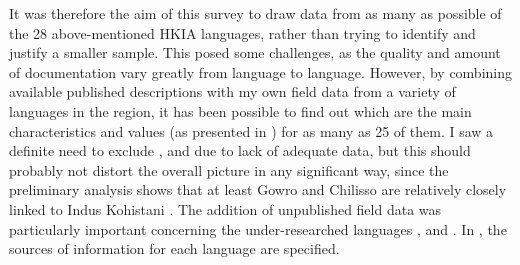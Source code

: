 \documentclass[output=collectionpaper]{langsci/langscibook}
\begin{document}
It was therefore the aim of this survey to draw data from as many as possible of the 28 above-mentioned HKIA languages, rather than trying to identify and justify a smaller sample. This posed some challenges, as the quality and amount of documentation vary greatly from language to language. However, by combining available published descriptions with my own field data from a variety of languages in the region, it has been possible to find out which are the main characteristics and values (as presented in ) for as many as 25 of them. I saw a definite need to exclude ,  and  due to lack of adequate data, but this should probably not distort the overall picture in any significant way, since the preliminary analysis shows that at least Gowro and Chilisso are relatively closely linked to Indus Kohistani \citep[874]{Bashir2003}. The addition of unpublished field data was particularly important concerning the under-researched languages ,  and . In , the sources of information for each language are specified.
\end{document}
